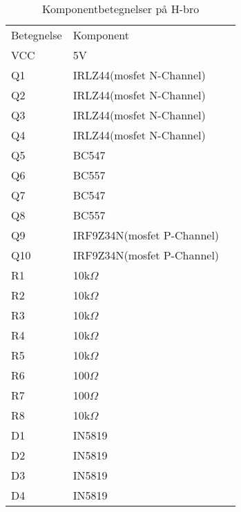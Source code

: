 \begin{table}[]
	\centering
	\caption{Komponentbetegnelser på H-bro}
	\label{my-label}
	\begin{tabular}{|l|l|l}
		\cline{1-2}
		Betegnelse 	& Komponent 	          	 &  \\ \cline{1-2}
		VCC        	& 5V                         &  \\ \cline{1-2}
		Q1   		& IRLZ44(mosfet N-Channel)   &  \\ \cline{1-2}
		Q2   		& IRLZ44(mosfet N-Channel)   &  \\ \cline{1-2}
		Q3   		& IRLZ44(mosfet N-Channel)   &  \\ \cline{1-2}
		Q4   		& IRLZ44(mosfet N-Channel)   &  \\ \cline{1-2}
		Q5   		& BC547                      &  \\ \cline{1-2}
		Q6   		& BC557                      &  \\ \cline{1-2}
		Q7   		& BC547                      &  \\ \cline{1-2}
		Q8   		& BC557                      &  \\ \cline{1-2}
		Q9   		& IRF9Z34N(mosfet P-Channel) &  \\ \cline{1-2}
		Q10  		& IRF9Z34N(mosfet P-Channel) &  \\ \cline{1-2}
		R1   		& 10k$\Omega$                &  \\ \cline{1-2}
		R2   		& 10k$\Omega$                &  \\ \cline{1-2}
		R3   		& 10k$\Omega$                &  \\ \cline{1-2}
		R4   		& 10k$\Omega$                &  \\ \cline{1-2}
		R5   		& 10k$\Omega$                &  \\ \cline{1-2}
		R6   		& 100$\Omega$                &  \\ \cline{1-2}
		R7   		& 100$\Omega$                &  \\ \cline{1-2}
		R8   		& 10k$\Omega$                &  \\ \cline{1-2}
		D1   		& IN5819                     &  \\ \cline{1-2}
		D2   		& IN5819                     &  \\ \cline{1-2}
		D3   		& IN5819                     &  \\ \cline{1-2}
		D4   		& IN5819                     &  \\ \cline{1-2}
	\end{tabular}
\end{table}

